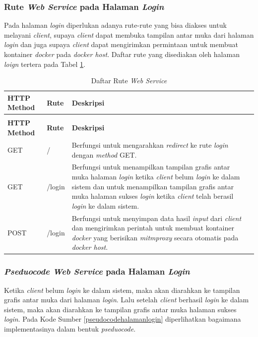 \subsubsection{Rute \textit{Web Service} pada Halaman \textit{Login}}
Pada halaman \textit{login} diperlukan adanya rute-rute yang bisa diakses untuk melayani \textit{client}, supaya \textit{client} dapat membuka tampilan antar muka dari halaman \textit{login} dan juga supaya \textit{client} dapat mengirimkan permintaan untuk membuat kontainer \textit{docker} pada \textit{docker host}. Daftar rute yang disediakan oleh halaman \textit{loign} tertera pada Tabel \ref{tabelRuteWebServiceHalamnLogin}.\\
\begin{longtable}{|p{}|p{}|p{}|p{}|} %
	
	\caption{Daftar Rute \textit{Web Service}} \label{tabelRuteWebServiceHalamnLogin} \\
	\hline
	\textbf{HTTP Method} & \textbf{Rute} & \textbf{Deskripsi} \\ \hline
	
	\endfirsthead
	\caption[]{Daftar Rute \textit{Web Service}}  \\
	\hline
	\textbf{HTTP Method} & \textbf{Rute} & \textbf{Deskripsi}  \\ \hline
	
	\endhead
	\endfoot
	\endlastfoot
	
	GET & / & Berfungsi untuk mengarahkan \textit{redirect} ke rute \textit{login} dengan \textit{method} GET.\\ \hline
	GET & /login & Berfungsi untuk menampilkan tampilan grafis antar muka halaman \textit{login} ketika \textit{client} belum \textit{login} ke dalam sistem dan untuk menampilkan tampilan grafis antar muka halaman sukses \textit{login} ketika \textit{client} telah berasil \textit{login} ke dalam sistem.\\ \hline
	POST & /login & Berfungsi untuk menyimpan data hasil \textit{input} dari \textit{client} dan mengirimkan perintah untuk membuat kontainer \textit{docker} yang berisikan \textit{mitmproxy} secara otomatis pada \textit{docker host}.\\ \hline
\end{longtable}

\subsubsection{\textit{Pseduocode Web Service} pada Halaman \textit{Login}}
Ketika \textit{client} belum \textit{login} ke dalam sistem, maka akan diarahkan ke tampilan grafis antar muka dari halaman \textit{login}. Lalu setelah \textit{client} berhasil \textit{login} ke dalam sistem, maka akan diarahkan ke tampilan grafis antar muka halaman sukses \textit{login}. Pada Kode Sumber \ref{pseudocodehalamanlogin} diperlihatkan bagaimana implementasinya dalam bentuk \textit{pseduocode}.

